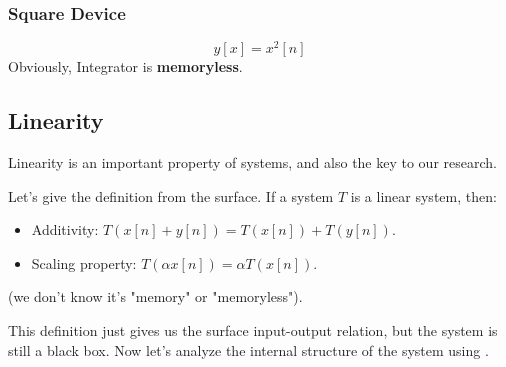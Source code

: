     \subsubsection{Square Device}
        \begin{equation}
            y[x] = x^2[n]
        \end{equation}
    Obviously, Integrator is \textbf{memoryless}.

    \subsection{Linearity}
        Linearity is an important property of systems, and also the key to our research.
        
        Let's give the definition from the surface.
        If a system $T$ is a linear system, then:
            \begin{itemize}
                \item Additivity: $T(x[n] + y[n]) = T(x[n]) + T(y[n])$.
                \item Scaling property: $T(\alpha x[n]) = \alpha T(x[n])$.
            \end{itemize}
        (we don't know it's "memory" or "memoryless").

        This definition just gives us the surface input-output relation, but the system is still a black box.
        Now let's analyze the internal structure of the system using .

